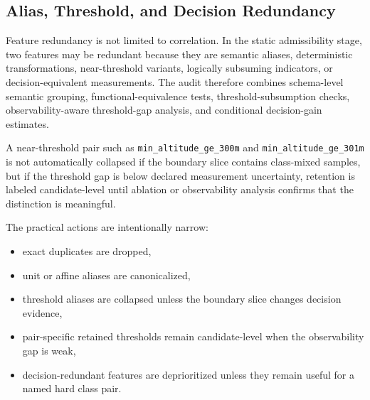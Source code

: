 \subsection{Alias, Threshold, and Decision Redundancy}
\label{subsec:static-admissibility-alias-threshold-redundancy}

Feature redundancy is not limited to correlation. In the static admissibility
stage, two features may be redundant because they are semantic aliases,
deterministic transformations, near-threshold variants, logically subsuming
indicators, or decision-equivalent measurements. The audit therefore combines
schema-level semantic grouping, functional-equivalence tests,
threshold-subsumption checks, observability-aware threshold-gap analysis, and
conditional decision-gain estimates.

A near-threshold pair such as \texttt{min\_altitude\_ge\_300m} and
\texttt{min\_altitude\_ge\_301m} is not automatically collapsed if the boundary
slice contains class-mixed samples, but if the threshold gap is below declared
measurement uncertainty, retention is labeled candidate-level until ablation or
observability analysis confirms that the distinction is meaningful.

The practical actions are intentionally narrow:
\begin{itemize}
  \item exact duplicates are dropped,
  \item unit or affine aliases are canonicalized,
  \item threshold aliases are collapsed unless the boundary slice changes
        decision evidence,
  \item pair-specific retained thresholds remain candidate-level when the
        observability gap is weak,
  \item decision-redundant features are deprioritized unless they remain useful
        for a named hard class pair.
\end{itemize}
